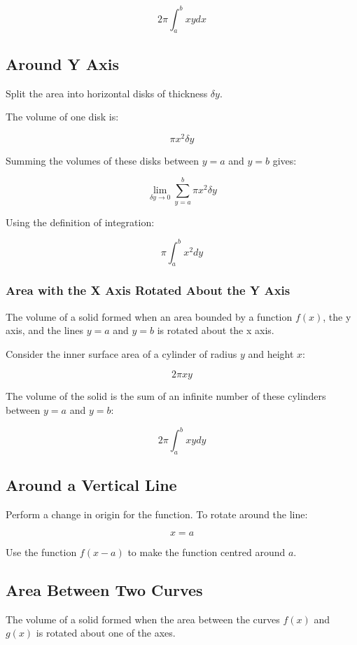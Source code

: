 \documentclass[a4paper,11pt]{report}
\begin{document}
$$
2 \pi \int^b_a x y dx
$$

\subsection{Around Y Axis}

Split the area into horizontal disks of thickness $\delta y$.

The volume of one disk is:

$$
\pi x^2 \delta y
$$

Summing the volumes of these disks between $y = a$ and $y = b$ gives:

$$
\lim_{\delta y \to 0} \sum_{y = a}^{b} \pi x^2 \delta y
$$

Using the definition of integration:

$$
\pi \int^b_a x^2 dy
$$

\subsubsection{Area with the X Axis Rotated About the Y Axis}

The volume of a solid formed when an area bounded by a function $f(x)$, the y
axis, and the lines $y = a$ and $y = b$ is rotated about the x axis.

Consider the inner surface area of a cylinder of radius $y$ and height $x$:

$$
2 \pi x y
$$

The volume of the solid is the sum of an infinite number of these cylinders
between $y = a$ and $y = b$:

$$
2 \pi \int^b_a x y dy
$$

\subsection{Around a Vertical Line}

Perform a change in origin for the function. To rotate around the line:

$$
x = a
$$

Use the function $f(x - a)$ to make the function centred around $a$.

\subsection{Area Between Two Curves}

The volume of a solid formed when the area between the curves $f(x)$ and $g(x)$
is rotated about one of the axes.
\end{document}
